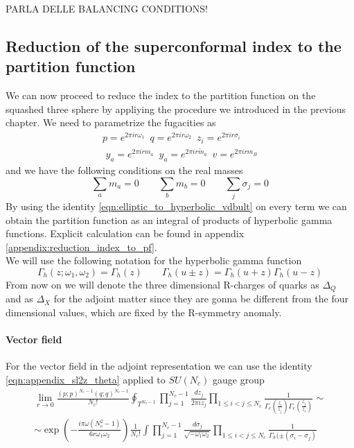 {\Huge PARLA DELLE BALANCING CONDITIONS!}
\subsection{Reduction of the superconformal index to the partition function}
We can now proceed to reduce the index to the partition function on the squashed three sphere by appliying the procedure we introduced in the previous chapter. 
We need to parametrize the fugacities as
\begin{gather}
p = e^{ 2 \pi i r  \omega_1 } \, \, \,  q = e^{ 2 \pi i r \omega_2 } \,  \, \, z_i = e^{ 2 \pi i r \sigma_i } \\
\, \, y_a = e^{ 2 \pi i r m_a } \, \,  \,
y_a = e^{ 2 \pi i r  {\tilde m_a} } \, \, \,  v = e^{ 2 \pi i r m_B}
\label{eqn:fugacities_redefined_el}
\end{gather}
and we have the following conditions on the real masses
\begin{equation}
\sum_a m_a =0 \qquad \sum_b m_b = 0 \qquad \sum_j \sigma_j = 0
\end{equation}
By using the identity \eqref{eqn:elliptic_to_hyperbolic_vdbult} on every term we can obtain the partition function as an integral of products of hyperbolic gamma functions.
Explicit calculation can be found in appendix \ref{appendix:reduction_index_to_pf}.\\
We will use the following notation for the hyperbolic gamma function
\begin{equation}
\Gamma_h (z ; \omega_1 , \omega_2) = \Gamma_h(z) \qquad \Gamma_h ( u \pm z) = \Gamma_h( u + z) \Gamma_h( u - z)
\end{equation}
From now on we will denote the three dimensional R-charges of quarks as $\Delta_Q$ and as $\Delta_X$ for the adjoint matter since they are gonna be different from the four dimensional values, which are fixed by the R-symmetry anomaly.

\paragraph{Vector field}

For the vector field in the adjoint representation we can use the identity \eqref{eqn:appendix_sl2z_theta} applied to $SU(N_c)$ gauge group
\begin{multline}
\lim_{r \rightarrow 0} \frac{ (p;p)^{N_c- 1}(q;q)^{N_c- 1} }{ N_c ! }
\oint_{T^{N_c -1}} \prod_{j=1}^{N_c -1 } \frac{ d z_j}{2 \pi i z_j} \prod_{1 \leq i<j \leq N_c } \frac{1}{\Gamma_e( \frac{z_i}{z_j} )\Gamma_e( \frac{z_j}{z_i} )} \sim
\\
\sim 
\exp \left(  
- \frac{ i \pi \omega (N_c^2 -1)}{6 r \omega_1 \omega_2}
\right)
 \frac{1}{N_c !} \int \prod_{j=1}^{N_c -1 } \frac{d \sigma_j}{\sqrt{- \omega_1 \omega_2} } \prod_{1 \leq i<j \leq N_c }\frac{1}{\Gamma_h( \pm (\sigma_i - \sigma_j) }
\end{multline}

